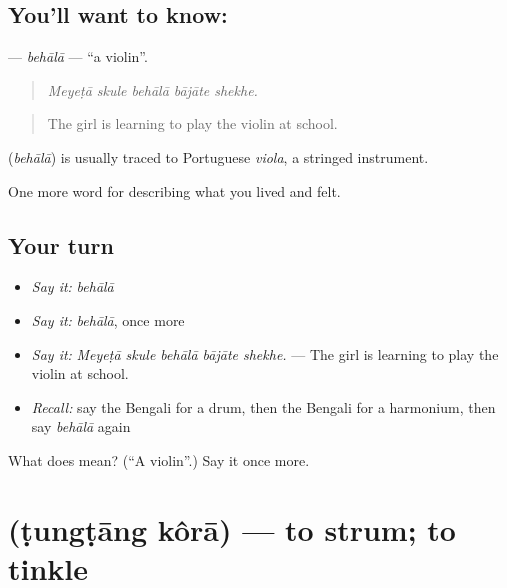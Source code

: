 \subsection*{You'll want to know: }
\textbf{} — \emph{behālā} — \textquotedblleft{}a violin\textquotedblright{}.

\begin{quote}
    
\end{quote}

\begin{quote}
\emph{Meyeṭā skule behālā bājāte shekhe.}
\end{quote}

\begin{quote}
The girl is learning to play the violin at school.
\end{quote}

\begin{cousinweb}
\textbf{} (\emph{behālā}) is usually traced to Portuguese \emph{viola}, a stringed instrument.
\end{cousinweb}

\begin{grammarlens}[title={What you've built}]
One more word for describing what you lived and felt.
\end{grammarlens}

\subsection*{Your turn}
\begin{itemize}
\raggedright
  \item \emph{Say it:} \emph{behālā}
  \item \emph{Say it:} \emph{behālā}, once more
  \item \emph{Say it:} \emph{Meyeṭā skule behālā bājāte shekhe.} — The girl is learning to play the violin at school.
  \item \emph{Recall:} say the Bengali for a drum, then the Bengali for a harmonium, then say \emph{behālā} again
\end{itemize}

\begin{tcolorbox}[breakable,colback=teal!4,colframe=teal!35!black,title={Before you move on}]
What does  mean? (\textquotedblleft{}A violin\textquotedblright{}.) Say it once more.
\end{tcolorbox}
\section[\texorpdfstring{\bn{টুংটাং} \bn{করা} (ṭungṭāng kôrā)}{টুংটাং করা (ṭungṭāng kôrā)}]{  (ṭungṭāng kôrā) — to strum; to tinkle}


